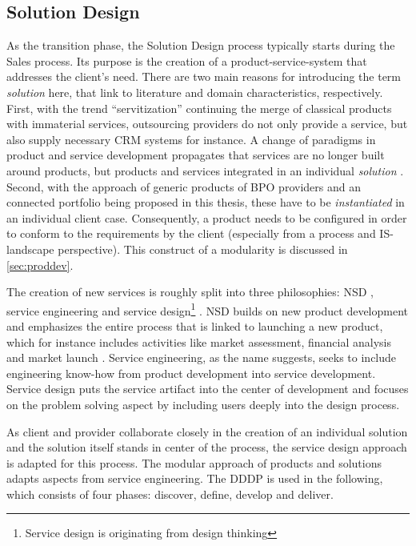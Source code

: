 \subsection{Solution Design}
	\label{sec:soldef}
	As the transition phase, the Solution Design process typically starts during the Sales process. Its purpose is the creation of a product-service-system that addresses the client's need. There are two main reasons for introducing the term \textit{solution} here, that link to literature and domain characteristics, respectively. First, with the trend \enquote{servitization} \citep{servitization} continuing the merge of classical products with immaterial services, outsourcing providers do not only provide a service, but also supply necessary \acrshort{CRM} systems for instance. A change of paradigms in product and service development propagates that services are no longer built around products, but products and services integrated in an individual \textit{solution} \citep[]{Spath2006}.
	Second, with the approach of generic products of \acrshort{BPO} providers and an connected portfolio being proposed in this thesis, these have to be \textit{instantiated} in an individual client case. Consequently, a product needs to be configured in order to conform to the requirements by the client (especially from a process and  \acrshort{IS}-landscape perspective). This construct of a modularity is discussed in \ref{sec:proddev}. 
	
	 The creation of new services is roughly split into three philosophies: \acrfull{NSD} \citep{cowell1988new}, service engineering \citep{9783540253242} and service design\footnote{Service design is originating from design thinking} \citep{rowe1987design}. \acrshort{NSD} builds on new product development and emphasizes the entire process that is linked to launching a new product, which for instance includes activities like market assessment, financial analysis and market launch \citep{cooper1988new}. Service engineering, as the name suggests, seeks to include engineering know-how from product development into service development. Service design puts the service artifact into the center of development and focuses on the problem solving aspect by including users deeply into the design process. 
	 
	 As client and provider collaborate closely in the creation of an individual solution and the solution itself stands in center of the process, the service design approach is adapted for this process. The modular approach of products and solutions adapts aspects from service engineering. The \acrfull{DDDP} \citep{dcdd} is used in the following, which consists of four phases: discover, define, develop and deliver.
	 
